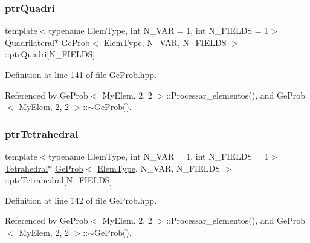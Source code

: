 \subsubsection{\texorpdfstring{ptr\+Quadri}{ptrQuadri}}
{\footnotesize\ttfamily template$<$typename Elem\+Type, int N\+\_\+\+V\+AR = 1, int N\+\_\+\+F\+I\+E\+L\+DS = 1$>$ \\
\hyperlink{classQuadrilateral}{Quadrilateral}$\ast$ \hyperlink{classGeProb}{Ge\+Prob}$<$ \hyperlink{spectral_8h_aaa2c1a7b2d1b12c590d730fe6ac839fa}{Elem\+Type}, N\+\_\+\+V\+AR, N\+\_\+\+F\+I\+E\+L\+DS $>$\+::ptr\+Quadri\mbox{[}N\+\_\+\+F\+I\+E\+L\+DS\mbox{]}\hspace{0.3cm}{\ttfamily [protected]}}



Definition at line 141 of file Ge\+Prob.\+hpp.



Referenced by Ge\+Prob$<$ My\+Elem, 2, 2 $>$\+::\+Processar\+\_\+elementos(), and Ge\+Prob$<$ My\+Elem, 2, 2 $>$\+::$\sim$\+Ge\+Prob().

\mbox{\label{classGeProb_a4e2d7b57253812234e2417097659c40c}} 
\subsubsection{\texorpdfstring{ptr\+Tetrahedral}{ptrTetrahedral}}
{\footnotesize\ttfamily template$<$typename Elem\+Type, int N\+\_\+\+V\+AR = 1, int N\+\_\+\+F\+I\+E\+L\+DS = 1$>$ \\
\hyperlink{classTetrahedral}{Tetrahedral}$\ast$ \hyperlink{classGeProb}{Ge\+Prob}$<$ \hyperlink{spectral_8h_aaa2c1a7b2d1b12c590d730fe6ac839fa}{Elem\+Type}, N\+\_\+\+V\+AR, N\+\_\+\+F\+I\+E\+L\+DS $>$\+::ptr\+Tetrahedral\mbox{[}N\+\_\+\+F\+I\+E\+L\+DS\mbox{]}\hspace{0.3cm}{\ttfamily [protected]}}



Definition at line 142 of file Ge\+Prob.\+hpp.



Referenced by Ge\+Prob$<$ My\+Elem, 2, 2 $>$\+::\+Processar\+\_\+elementos(), and Ge\+Prob$<$ My\+Elem, 2, 2 $>$\+::$\sim$\+Ge\+Prob().

\mbox{\label{classGeProb_a9fa6ab6ca8b9a2352642a72042d8cf4d}} 
